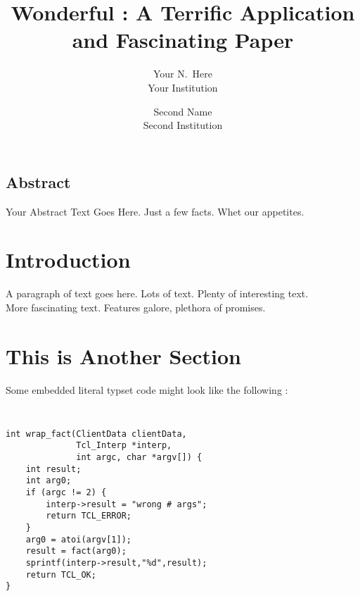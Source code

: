 \documentclass[letterpaper,twocolumn,10pt]{article}
\begin{document}
\date{}

\title{\Large \bf Wonderful : A Terrific Application and Fascinating Paper}

\author{
{\rm Your N.\ Here}\\
Your Institution
\and
{\rm Second Name}\\
Second Institution
} %

\maketitle

\thispagestyle{empty}


\subsection*{Abstract}
Your Abstract Text Goes Here.  Just a few facts.
Whet our appetites.

\section{Introduction}

A paragraph of text goes here.  Lots of text.  Plenty of interesting
text. \\

More fascinating text. Features galore, plethora of promises.\\

\section{This is Another Section}

Some embedded literal typset code might 
look like the following :

{\tt \small
\begin{verbatim}
int wrap_fact(ClientData clientData,
              Tcl_Interp *interp,
              int argc, char *argv[]) {
    int result;
    int arg0;
    if (argc != 2) {
        interp->result = "wrong # args";
        return TCL_ERROR;
    }
    arg0 = atoi(argv[1]);
    result = fact(arg0);
    sprintf(interp->result,"%d",result);
    return TCL_OK;
}
\end{verbatim}
}
\end{document}
